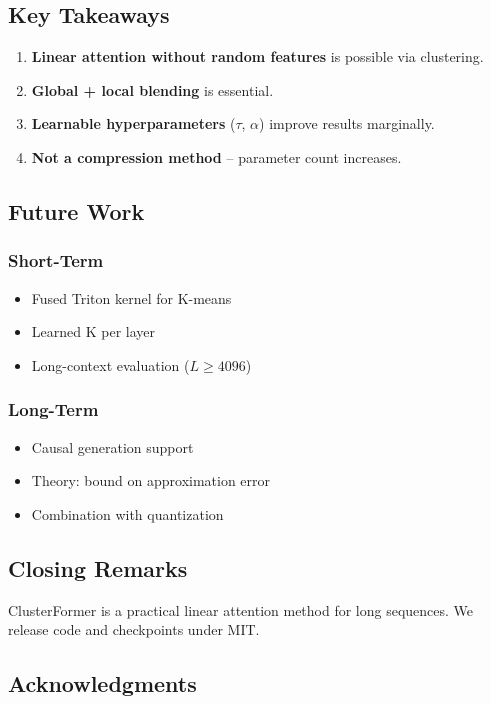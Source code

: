 \subsection{Key Takeaways}

\begin{enumerate}
\item \textbf{Linear attention without random features} is possible via clustering.
\item \textbf{Global + local blending} is essential.
\item \textbf{Learnable hyperparameters} ($\tau$, $\alpha$) improve results marginally.
\item \textbf{Not a compression method} -- parameter count increases.

\end{enumerate}
\subsection{Future Work}

\subsubsection{Short-Term}
\begin{itemize}
\item Fused Triton kernel for K-means
\item Learned K per layer
\item Long-context evaluation ($L \geq 4096$)

\end{itemize}
\subsubsection{Long-Term}
\begin{itemize}
\item Causal generation support
\item Theory: bound on approximation error
\item Combination with quantization

\end{itemize}
\subsection{Closing Remarks}

ClusterFormer is a practical linear attention method for long sequences. 
We release code and checkpoints under MIT.

\subsection{Acknowledgments}

